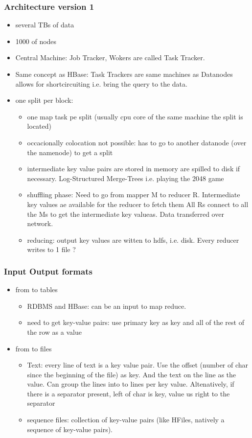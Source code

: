 \subsubsection{Architecture version 1}
\begin{itemize}
    \item several TBs of data
    \item 1000 of nodes
    \item Central Machine: Job Tracker, Wokers  are called Task Tracker.
    \item Same concept as HBase: Task Trackers are same machines as Datanodes \textrightarrow allows for shortcircuiting
    i.e. bring the query to the data.
    \item one split per block:
    \begin{itemize}
        \item one map task pe split (usually cpu core of the same machine the split is located)
        \item occacionally colocation not possible: has to go to another datanode (over the namenode) to get a split
        \item intermediate key value pairs are stored in memory are spilled to disk if necessary. Log-Structured Merge-Trees
        i.e. playing the 2048 game
        \item shuffling phase: Need to go from mapper M to reducer R. Intermediate key values ae available for the reducer to fetch them
        All Rs connect to all the Ms to get the intermediate key valueas. Data transferred over network.
        \item reducing: output key values are witten to hdfs, i.e. disk. Every reducer writes to 1 file ?
    \end{itemize}
\end{itemize}

\subsubsection{Input Output formats}
\begin{itemize}
    \item from to tables
    \begin{itemize}
        \item RDBMS and HBase: can be an input to map reduce.
        \item need to get key-value pairs: use primary key as key and all of the rest of the row as a value
    \end{itemize}
    \item from to files
    \begin{itemize}
        \item Text: every line of text is a key value pair. Use the offset (number of char since the beginning of the file)
        as key. And the text on the line as the value. Can group the lines into to lines per key value.
        Altenatively, if there is a separator present, left of char is key, value us right to the separator
        \item sequence files: collection of key-value pairs (like HFiles, natively a sequence of key-value pairs).
    \end{itemize}
\end{itemize}

